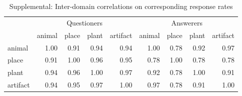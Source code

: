 \documentclass[12pt, floatsintext, jou]{apa6}
\newcommand{\ndg}[1]{\textcolor{Green}{[ndg: #1]}}
\begin{document}





\begin{table}[t!]
\centering
\begin{tabular}{ p{1.5cm} | r | r | r | r |||||| r | r | r | r |}
& \multicolumn{4}{c||||||}{Questioners} & \multicolumn{4}{c}{Answerers} \\
&             animal &     place &     plant &  artifact &            animal &     place &     plant &  artifact \\
\hline
animal &   1.00 &  0.91 & 0.94 & 0.94 & 1.00 & 0.78 & 0.92 &  0.97 \\
\hline
place &    0.91 &  1.00 & 0.96 & 0.95 & 0.78 & 1.00 &  0.78 & 0.78 \\
\hline
plant &    0.94 & 0.96 & 1.00 & 0.97 & 0.92  & 0.78 &  1.00 & 0.91\\
\hline
artifact & 0.94 & 0.95 & 0.97 & 1.00 & 0.97 & 0.78 &  0.91 & 1.00\\
\end{tabular}
\\[1.5pt]
\caption{Supplemental: Inter-domain correlations on corresponding response rates} 
\label{table:experiment4correlations}
\end{table}
\end{document}
